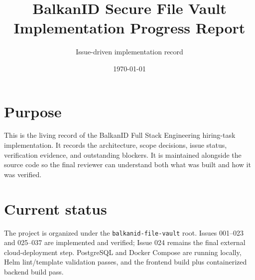 \documentclass[11pt,a4paper]{article}
\title{BalkanID Secure File Vault\\Implementation Progress Report}
\author{Issue-driven implementation record}
\date{\today}
\begin{document}
\maketitle

\section*{Purpose}
This is the living record of the BalkanID Full Stack Engineering hiring-task implementation. It records the architecture, scope decisions, issue status, verification evidence, and outstanding blockers. It is maintained alongside the source code so the final reviewer can understand both what was built and how it was verified.

\section{Current status}
The project is organized under the \texttt{balkanid-file-vault} root. Issues 001--023 and 025--037 are implemented and verified; Issue 024 remains the final external cloud-deployment step. PostgreSQL and Docker Compose are running locally, Helm lint/template validation passes, and the frontend build plus containerized backend build pass.
\end{document}
